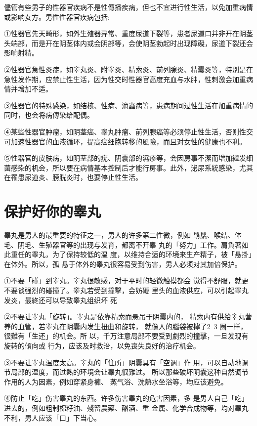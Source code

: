 \documentclass[12pt,UTF8]{ctexbook}
\begin{document}
儘管有些男子的性器官疾病不是性傳播疾病，但也不宜进行性生活，以免加重病情或影响女方。男性性器官疾病包括:

①性器官先天畸形，如外生殖器异常、重度尿道下裂等，患者尿道口并非开在阴茎头端部，而是开在阴茎体内或会阴部等，会使阴茎勃起时出现障礙，尿道下裂还会影响射精。

②性器官急性炎症，如睾丸炎、附睾炎、精索炎、前列腺炎、精囊炎等，特別是在急性发作期，应禁止性生活，因为性交时性器官高度充血与水肿，性刺激会加重病情并增加不适。

③性器官的特殊感染，如结核、性病、滴蟲病等，患病期间过性生活在加重病情的同时，也会将病傳染给配偶。

④某些性器官肿瘤，如阴茎癌、睾丸肿瘤、前列腺癌等必须停止性生活，否则性交可加速性器官的血液循环，提高癌细胞转移的風險，而且对女性的健康也不利。

⑤性器官的皮肤病，如阴茎部的疣、阴囊部的濕疹等，会因房事不潔而增加繼发细菌感染的机会，所以要在病情基本控制后才能行房事。此外，泌尿系統感染，尤其在罹患尿道炎、膀胱炎时，也要停止性生活。

\section{保护好你的睾丸}

睾丸是男人的最重要的特征之一，男人的许多第二性微，例如
鬍鬚、喉结、体毛、阴毛、生殖器官等的出现与发育，都离不开睾
丸的「努力」工作。肩負著如此重任的睾丸，为了保持较低的温
度，以维持合适的环境来生产精子，被「悬掛」在体外。所以，孤
悬于体外的睾丸很容易受到伤害，男人必须对其加倍保护。

①不要「碰」到睾丸。睾丸很敏感，对于平时的轻微触摸都会
觉得不舒服，就更不要谈强烈的碰撞了。睾丸若受到撞擊，会妨礙
里头的血液供应，可以引起睾丸发炎，最終还可以导致睾丸组织坏
死

②不要让睾丸「旋转」。睾丸是依靠精索而悬吊于阴囊内的，
精索内有供给睾丸营养的血管，若睾丸在阴囊内发生扭曲和旋转，
就像人的腦袋被擰了2~3 圈一样，很難有「生还」的机会。所
以，千万注意局部不要受到劇烈的撞擊，一旦发现有旋转的傾向或
行为，应该及时救治，以免喪失良好的治疗机会。

③不要让睾丸温度太高。睾丸的「住所」阴囊具有「空调」作
用，可以自动地调节局部的温度，而过熱的环境会让睾丸很難过。
所以那些破坏阴囊这种自然调节作用的人为因素，例如穿紧身褲、
蒸气浴、洗熱水坐浴等，均应该避免。

④防止「吃」伤害睾丸的东西。许多伤害睾丸的危害因素，多
是男人自己「吃」进去的，例如粗制棉籽油、殘留農藥、酗酒、重
金属、化学合成物等，均对睾丸不利，男人应该「口」下当心。
\end{document}
